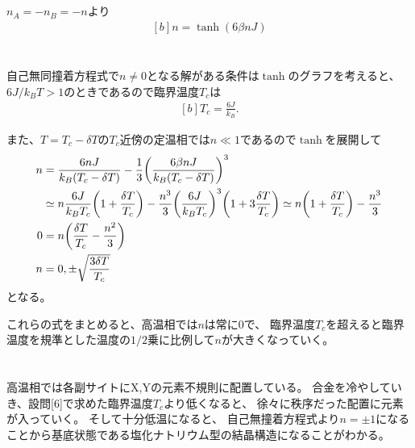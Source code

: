 \documentclass[../../master.tex]{subfiles}
\begin{document}
\section{}
\(n_A = -n_B = -n\)より
\begin{equation}\begin{aligned}[b]
    n = \tanh(6\beta nJ)
\end{aligned}\end{equation}

\section{}
自己無同撞着方程式で\(n\neq0\)となる解がある条件は\(\tanh\)のグラフを考えると、
\(6J/k_BT>1\)のときであるので臨界温度\(T_c\)は
\begin{equation}\begin{aligned}[b]
    T_c = \frac{6J}{k_B}.
\end{aligned}\end{equation}

また、\(T = T_c-\delta T\)の\(T_c\)近傍の定温相では\(n\ll 1\)であるので\(\tanh\)を展開して
\begin{equation}\begin{aligned}[b]
    n &= \frac{6nJ}{k_B(T_c-\delta T)} -\frac{1}{3}\qty(\frac{6\beta nJ}{k_B(T_c-\delta T)})^3\\
    &\simeq n\frac{6J}{k_BT_c}\qty(1+\frac{\delta T}{T_c})-\frac{n^3}{3}\qty(\frac{6J}{k_BT_c})^3\qty(1+3\frac{\delta T}{T_c})
    \simeq n\qty(1+\frac{\delta T}{T_c})-\frac{n^3}{3}\\
    0 &= n\qty(\frac{\delta T}{T_c}-\frac{n^2}{3})\\
    n &= 0, \pm\sqrt{\frac{3\delta T}{T_c}}
\end{aligned}\end{equation}
となる。

これらの式をまとめると、高温相では\(n\)は常に\(0\)で、
臨界温度\(T_c\)を超えると臨界温度を規準とした温度の\(1/2\)乗に比例して\(n\)が大きくなっていく。

\section{}
高温相では各副サイトにX,Yの元素不規則に配置している。
合金を冷やしていき、設問[6]で求めた臨界温度\(T_c\)より低くなると、
徐々に秩序だった配置に元素が入っていく。
そして十分低温になると、
自己無撞着方程式より\(n=\pm 1\)になることから基底状態である塩化ナトリウム型の結晶構造になることがわかる。
\end{document}
